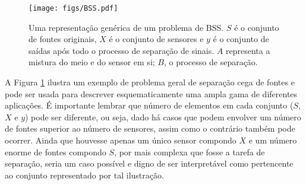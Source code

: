 \begin{figure}[H]
    \centering
    \texttt{[image: figs/BSS.pdf]}
    \caption{Uma representação genérica de um problema de BSS. $S$ é o conjunto de fontes originais, $X$ é o conjunto de sensores e $y$ é o conjunto de saídas após todo o processo de separação de sinais. $A$ representa a mistura do meio e do sensor em si; $B$, o processo de separação.}
    \label{fig:bss}
\end{figure}

A Figura \ref{fig:bss} ilustra um exemplo de problema geral de separação cega de fontes e pode ser usada para descrever esquematicamente uma ampla gama de diferentes aplicações. É importante lembrar que número de elementos em cada conjunto ($S$, $X$ e $y$) pode ser diferente, ou seja, dado há casos que podem envolver um número de fontes superior ao número de sensores, assim como o contrário também pode ocorrer. Ainda que houvesse apenas um único sensor compondo $X$ e um número enorme de fontes compondo $S$, por mais complexa que fosse a tarefa de separação, seria um caso possível e digno de ser interpretável como pertencente ao conjunto representado por tal ilustração.





